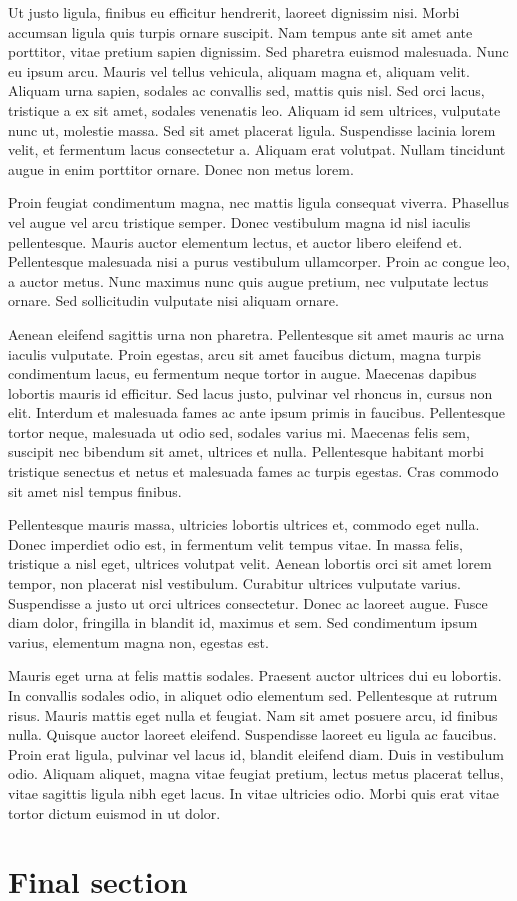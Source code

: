 \documentclass[11pt]{article}
\begin{document}
    Ut justo ligula, finibus eu efficitur hendrerit, laoreet dignissim nisi. Morbi accumsan ligula quis turpis ornare suscipit. Nam tempus ante sit amet ante porttitor, vitae pretium sapien dignissim. Sed pharetra euismod malesuada. Nunc eu ipsum arcu. Mauris vel tellus vehicula, aliquam magna et, aliquam velit. Aliquam urna sapien, sodales ac convallis sed, mattis quis nisl. Sed orci lacus, tristique a ex sit amet, sodales venenatis leo. Aliquam id sem ultrices, vulputate nunc ut, molestie massa. Sed sit amet placerat ligula. Suspendisse lacinia lorem velit, et fermentum lacus consectetur a. Aliquam erat volutpat. Nullam tincidunt augue in enim porttitor ornare. Donec non metus lorem.

    Proin feugiat condimentum magna, nec mattis ligula consequat viverra. Phasellus vel augue vel arcu tristique semper. Donec vestibulum magna id nisl iaculis pellentesque. Mauris auctor elementum lectus, et auctor libero eleifend et. Pellentesque malesuada nisi a purus vestibulum ullamcorper. Proin ac congue leo, a auctor metus. Nunc maximus nunc quis augue pretium, nec vulputate lectus ornare. Sed sollicitudin vulputate nisi aliquam ornare.

    Aenean eleifend sagittis urna non pharetra. Pellentesque sit amet mauris ac urna iaculis vulputate. Proin egestas, arcu sit amet faucibus dictum, magna turpis condimentum lacus, eu fermentum neque tortor in augue. Maecenas dapibus lobortis mauris id efficitur. Sed lacus justo, pulvinar vel rhoncus in, cursus non elit. Interdum et malesuada fames ac ante ipsum primis in faucibus. Pellentesque tortor neque, malesuada ut odio sed, sodales varius mi. Maecenas felis sem, suscipit nec bibendum sit amet, ultrices et nulla. Pellentesque habitant morbi tristique senectus et netus et malesuada fames ac turpis egestas. Cras commodo sit amet nisl tempus finibus.

    Pellentesque mauris massa, ultricies lobortis ultrices et, commodo eget nulla. Donec imperdiet odio est, in fermentum velit tempus vitae. In massa felis, tristique a nisl eget, ultrices volutpat velit. Aenean lobortis orci sit amet lorem tempor, non placerat nisl vestibulum. Curabitur ultrices vulputate varius. Suspendisse a justo ut orci ultrices consectetur. Donec ac laoreet augue. Fusce diam dolor, fringilla in blandit id, maximus et sem. Sed condimentum ipsum varius, elementum magna non, egestas est.

    Mauris eget urna at felis mattis sodales. Praesent auctor ultrices dui eu lobortis. In convallis sodales odio, in aliquet odio elementum sed. Pellentesque at rutrum risus. Mauris mattis eget nulla et feugiat. Nam sit amet posuere arcu, id finibus nulla. Quisque auctor laoreet eleifend. Suspendisse laoreet eu ligula ac faucibus. Proin erat ligula, pulvinar vel lacus id, blandit eleifend diam. Duis in vestibulum odio. Aliquam aliquet, magna vitae feugiat pretium, lectus metus placerat tellus, vitae sagittis ligula nibh eget lacus. In vitae ultricies odio. Morbi quis erat vitae tortor dictum euismod in ut dolor.
    \section{Final section}
\end{document}
